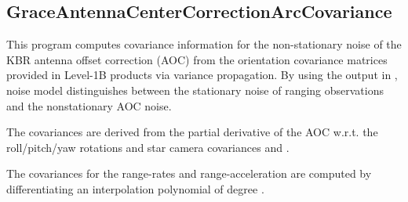 \clearpage
\subsection{GraceAntennaCenterCorrectionArcCovariance}\label{GraceAntennaCenterCorrectionArcCovariance}
This program computes covariance information for the non­-stationary noise of the KBR antenna offset correction (AOC)
from the orientation covariance matrices provided in Level-1B products via variance propagation.
By using the output  in ,
noise model distinguishes between the stationary noise of ranging observations and the non­stationary AOC noise.

The covariances are derived from the partial derivative of the AOC w.r.t. the roll/pitch/yaw rotations
and star camera covariances  and .

The covariances for the range-rates and range-acceleration are computed by differentiating
an interpolation polynomial of degree .


